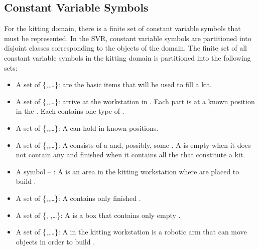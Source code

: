 \subsection{Constant Variable Symbols}
For the kitting domain, there is a finite set of constant variable symbols that must be represented. In the SVR, constant variable symbols are partitioned into disjoint classes corresponding to the objects of the domain. The finite set of all constant variable symbols in the kitting domain is partitioned into the following sets:
\begin{itemize}
\item A set of  \{,,\ldots\}:  are the basic items that will be used to fill a kit.

\item A set of  \{,,\ldots\}:  arrive at the workstation in . Each part is at a known position in the . Each  contains one type of .

\item A set of  \{,,\ldots\}:  A  can hold  in known positions.

\item A set of  \{,,\ldots\}: A  consists of a  and, possibly, some . A  is empty when it does not contain any  and finished when it contains all the  that constitute a kit.

\item A symbol  -- : A  is an area in the kitting workstation where  are placed to build .

\item A set of  \{,,\ldots\}: A  contains only finished .

\item A set of  \{, ,\ldots\}: A  is a box that contains only empty .

\item A set of  \{,,\ldots\}: A  in the kitting workstation is a robotic arm that can move objects in order to build .


\end{itemize}
